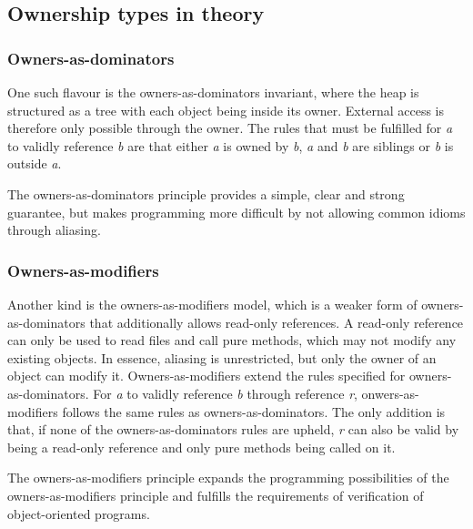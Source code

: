 \documentclass[sigplan,11pt,nonacm]{acmart}
\begin{document}
\subsection{Ownership types in theory}



\subsubsection{Owners-as-dominators}

One such flavour is the owners-as-dominators\cite{ownership-types-survey} invariant, where the heap is structured as a tree with each object being inside its owner.
External access is therefore only possible through the owner.
The rules that must be fulfilled for \emph{a} to validly reference \emph{b} are that either \emph{a} is owned by \emph{b}, \emph{a} and \emph{b} are siblings or \emph{b} is outside \emph{a}.

The owners-as-dominators principle provides a simple, clear and strong guarantee, but makes programming more difficult by not allowing common idioms through aliasing.
\cite{ownership-types-survey}


\subsubsection{Owners-as-modifiers}

Another kind is the owners-as-modifiers model, which is a weaker form of owners-as-dominators that additionally allows read-only references.
A read-only reference can only be used to read files and call pure methods, which may not modify any existing objects.
In essence, aliasing is unrestricted, but only the owner of an object can modify it.
Owners-as-modifiers extend the rules specified for owners-as-dominators.
For \emph{a} to validly reference \emph{b} through reference \emph{r}, onwers-as-modifiers follows the same rules as owners-as-dominators.
The only addition is that, if none of the owners-as-dominators rules are upheld, \emph{r} can also be valid by being a read-only reference and only pure methods being called on it.

The owners-as-modifiers principle expands the programming possibilities of the owners-as-modifiers principle and fulfills the requirements of verification of object-oriented programs.
\end{document}
